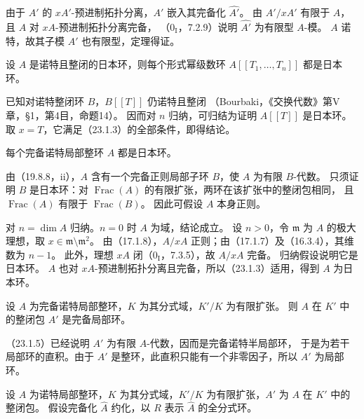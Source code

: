 由于 $A'$ 的 $xA'$-预进制拓扑分离，$A'$ 嵌入其完备化 $\widehat{A'}$。
由 $A'/xA'$ 有限于 $A$，且 $A$ 对 $xA$-预进制拓扑分离完备，
（$0_{\mathrm I}$，7.2.9）说明 $\widehat{A'}$ 为有限型 $A$-模。
$A$ 诺特，故其子模 $A'$ 也有限型，定理得证。
\finishproof

设 $A$ 是诺特且整闭的日本环，则每个形式幂级数环 $A[[T_1,\ldots,T_n]]$ 都是日本环。

\eproof
已知对诺特整闭环 $B$，$B[[T]]$ 仍诺特且整闭
（Bourbaki，《交换代数》第V章，\S1，第4目，命题14）。
因而对 $n$ 归纳，可归结为证明 $A[[T]]$ 是日本环。
取 $x=T$，它满足（23.1.3）的全部条件，即得结论。
\finishproof

每个完备诺特局部整环 $A$ 都是日本环。

\eproof
由（19.8.8，ii），$A$ 含有一个完备正则局部子环 $B$，使 $A$ 为有限 $B$-代数。
只须证明 $B$ 是日本环：对 $\operatorname{Frac}(A)$ 的有限扩张，两环在该扩张中的整闭包相同，
且 $\operatorname{Frac}(A)$ 有限于 $\operatorname{Frac}(B)$。
因此可假设 $A$ 本身正则。

对 $n=\dim A$ 归纳。$n=0$ 时 $A$ 为域，结论成立。
设 $n>0$，令 $\mathfrak m$ 为 $A$ 的极大理想，取 $x\in\mathfrak m\setminus\mathfrak m^2$。
由（17.1.8），$A/xA$ 正则；由（17.1.7）及（16.3.4），其维数为 $n-1$。
此外，理想 $xA$ 闭（$0_{\mathrm I}$，7.3.5），故 $A/xA$ 完备。
归纳假设说明它是日本环。
$A$ 也对 $xA$-预进制拓扑分离且完备，所以（23.1.3）适用，得到 $A$ 为日本环。
\finishproof

设 $A$ 为完备诺特局部整环，$K$ 为其分式域，$K'/K$ 为有限扩张。
则 $A$ 在 $K'$ 中的整闭包 $A'$ 是完备局部环。

\eproof
（23.1.5）已经说明 $A'$ 为有限 $A$-代数，因而是完备诺特半局部环，
于是为若干局部环的直积。由于 $A'$ 是整环，此直积只能有一个非零因子，所以 $A'$ 为局部环。
\finishproof

设 $A$ 为诺特局部整环，$K$ 为其分式域，$K'/K$ 为有限扩张，$A'$ 为 $A$ 在 $K'$ 中的整闭包。
假设完备化 $\widehat A$ 约化，以 $R$ 表示 $\widehat A$ 的全分式环。

